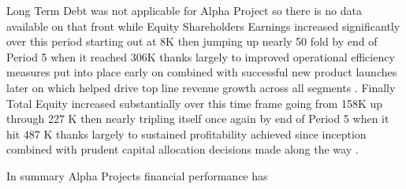  Long Term Debt was not applicable for Alpha Project so there is no data available on that front while Equity Shareholders Earnings increased significantly over this period starting out at 8K then jumping up nearly 50 fold by end of Period 5 when it reached 306K thanks largely to improved operational efficiency measures put into place early on combined with successful new product launches later on which helped drive top line revenue growth across all segments . Finally Total Equity increased substantially over this time frame going from 158K up through 227 K then nearly tripling itself once again by end of Period 5 when it hit 487 K thanks largely to sustained profitability achieved since inception combined with prudent capital allocation decisions made along the way . 

 In summary Alpha Projects financial performance has